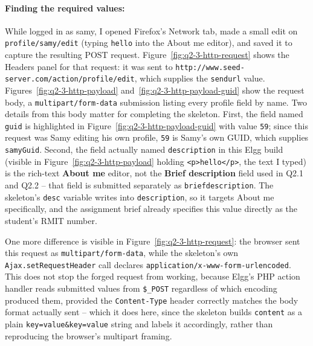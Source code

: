 \paragraph{Finding the required values:} While logged in as samy, I opened Firefox's Network tab, made a small edit on \texttt{profile/samy/edit} (typing \texttt{hello} into the About me editor), and saved it to capture the resulting POST request. Figure~\ref{fig:q2-3-http-request} shows the Headers panel for that request: it was sent to \texttt{http://www.seed-server.com/action/profile/edit}, which supplies the \texttt{sendurl} value. Figures~\ref{fig:q2-3-http-payload} and~\ref{fig:q2-3-http-payload-guid} show the request body, a \texttt{multipart/form-data} submission listing every profile field by name. Two details from this body matter for completing the skeleton. First, the field named \texttt{guid} is highlighted in Figure~\ref{fig:q2-3-http-payload-guid} with value \texttt{59}; since this request was Samy editing his own profile, \texttt{59} is Samy's own GUID, which supplies \texttt{samyGuid}. Second, the field actually named \texttt{description} in this Elgg build (visible in Figure~\ref{fig:q2-3-http-payload} holding \texttt{<p>hello</p>}, the text I typed) is the rich-text \textbf{About me} editor, not the \textbf{Brief description} field used in Q2.1 and Q2.2 -- that field is submitted separately as \texttt{briefdescription}. The skeleton's \texttt{desc} variable writes into \texttt{description}, so it targets About me specifically, and the assignment brief already specifies this value directly as the student's RMIT number.

One more difference is visible in Figure~\ref{fig:q2-3-http-request}: the browser sent this request as \texttt{multipart/\allowbreak{}form-data}, while the skeleton's own \texttt{Ajax.setRequestHeader} call declares \texttt{application/\allowbreak{}x-www-\allowbreak{}form-\allowbreak{}urlencoded}. This does not stop the forged request from working, because Elgg's PHP action handler reads submitted values from \texttt{\$\_POST} regardless of which encoding produced them, provided the \texttt{Content-Type} header correctly matches the body format actually sent -- which it does here, since the skeleton builds \texttt{content} as a plain \texttt{key=value\&key=value} string and labels it accordingly, rather than reproducing the browser's multipart framing.


